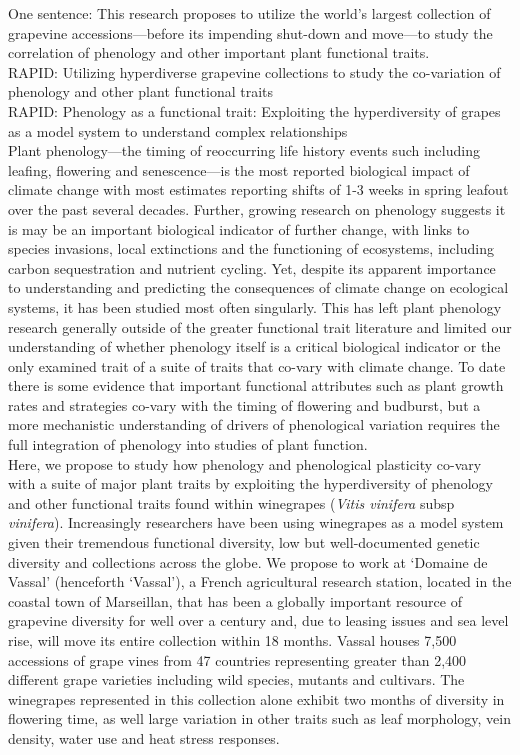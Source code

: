 \documentclass[10pt,letter,oneside]{article}
\begin{document}
One sentence: This research proposes to utilize the world's largest collection of grapevine accessions---before its impending shut-down and move---to study the correlation of phenology and other important plant functional traits.\\

RAPID: Utilizing hyperdiverse grapevine collections to study the co-variation of phenology and other plant functional traits \\

RAPID: Phenology as a
 functional trait: Exploiting the hyperdiversity of grapes as a model system to understand complex relationships\\

Plant phenology---the timing of reoccurring life history events such including leafing, flowering and senescence---is the most reported biological impact of climate change with most estimates reporting shifts of 1-3 weeks in spring leafout over the past several decades. Further, growing research on phenology suggests it is may be an important biological indicator of further change, with links to species invasions, local extinctions and the functioning of ecosystems, including carbon sequestration and nutrient cycling. Yet, despite its apparent importance to understanding and predicting the consequences of climate change on ecological systems, it has been studied most often singularly. This has left plant phenology research generally outside of the greater functional trait literature and limited our understanding of whether phenology itself is a critical biological indicator or the only examined trait of a suite of traits that co-vary with climate change. To date there is some evidence that important functional attributes such as plant growth rates and strategies co-vary with the timing of flowering and budburst, but a more mechanistic understanding of drivers of phenological variation requires the full integration of phenology into studies of plant function. \\

Here, we propose to study how phenology and phenological plasticity co-vary with a suite of major plant traits by exploiting the hyperdiversity of phenology and other functional traits found within winegrapes (\emph{Vitis vinifera} subsp \emph{vinifera}). Increasingly researchers have been using winegrapes as a model system given their tremendous functional diversity, low but well-documented genetic diversity and collections across the globe. We propose to work at `Domaine de Vassal' (henceforth `Vassal'), a French agricultural research station, located in the coastal town of Marseillan, that has been a globally important resource of grapevine diversity for well over a century and, due to leasing issues and sea level rise, will move its entire collection within 18 months. Vassal houses 7,500 accessions of grape vines from 47 countries representing greater than 2,400 different grape varieties including wild species, mutants and cultivars. The winegrapes represented in this collection alone exhibit two months of diversity in flowering time, as well large variation in other traits such as leaf morphology, vein density, water use and heat stress responses. \\
\end{document}
